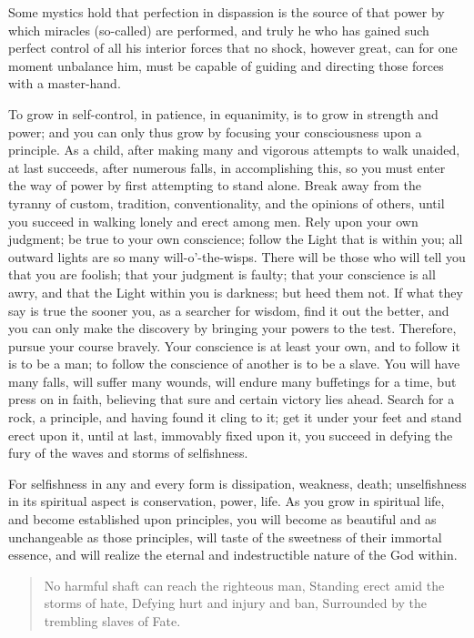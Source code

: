 \documentclass[12pt,oneside]{scrbook}
\begin{document}
  Some mystics hold that perfection in dispassion is the source of that
  power by which miracles (so-called) are performed, and truly he who has
  gained such perfect control of all his interior forces that no shock,
  however great, can for one moment unbalance him, must be capable of
  guiding and directing those forces with a master-hand.
  
  To grow in self-control, in patience, in equanimity, is to grow in
  strength and power; and you can only thus grow by focusing your
  consciousness upon a principle. As a child, after making many and
  vigorous attempts to walk unaided, at last succeeds, after numerous
  falls, in accomplishing this, so you must enter the way of power by
  first attempting to stand alone. Break away from the tyranny of custom,
  tradition, conventionality, and the opinions of others, until you
  succeed in walking lonely and erect among men. Rely upon your own
  judgment; be true to your own conscience; follow the Light that is
  within you; all outward lights are so many will-o'-the-wisps. There will
  be those who will tell you that you are foolish; that your judgment is
  faulty; that your conscience is all awry, and that the Light within you
  is darkness; but heed them not. If what they say is true the sooner you,
  as a searcher for wisdom, find it out the better, and you can only make
  the discovery by bringing your powers to the test. Therefore, pursue
  your course bravely. Your conscience is at least your own, and to follow
  it is to be a man; to follow the conscience of another is to be a slave.
  You will have many falls, will suffer many wounds, will endure many
  buffetings for a time, but press on in faith, believing that sure and
  certain victory lies ahead. Search for a rock, a principle, and having
  found it cling to it; get it under your feet and stand erect upon it,
  until at last, immovably fixed upon it, you succeed in defying the fury
  of the waves and storms of selfishness.
  
  For selfishness in any and every form is dissipation, weakness, death;
  unselfishness in its spiritual aspect is conservation, power, life. As
  you grow in spiritual life, and become established upon principles, you
  will become as beautiful and as unchangeable as those principles, will
  taste of the sweetness of their immortal essence, and will realize the
  eternal and indestructible nature of the God within.
  
  \begin{quote}
  No harmful shaft can reach the righteous man, Standing erect amid the
  storms of hate, Defying hurt and injury and ban, Surrounded by the
  trembling slaves of Fate.
  \end{quote}
  
\end{document}
